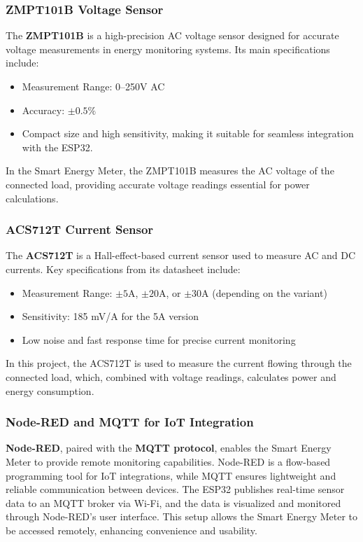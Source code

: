 \documentclass[a4paper,12pt]{report}
\begin{document}
\subsubsection{ZMPT101B Voltage Sensor}  
The \textbf{ZMPT101B} is a high-precision AC voltage sensor designed for accurate voltage measurements in energy monitoring systems. Its main specifications include:  
\begin{itemize}  
    \item Measurement Range: 0--250V AC  
    \item Accuracy: $\pm 0.5\%$  
    \item Compact size and high sensitivity, making it suitable for seamless integration with the ESP32.  
\end{itemize}  
In the Smart Energy Meter, the ZMPT101B measures the AC voltage of the connected load, providing accurate voltage readings essential for power calculations.  

\subsubsection{ACS712T Current Sensor}  
The \textbf{ACS712T} is a Hall-effect-based current sensor used to measure AC and DC currents. Key specifications from its datasheet include:  
\begin{itemize}  
    \item Measurement Range: $\pm 5$A, $\pm 20$A, or $\pm 30$A (depending on the variant)  
    \item Sensitivity: 185 mV/A for the 5A version  
    \item Low noise and fast response time for precise current monitoring  
\end{itemize}  
In this project, the ACS712T is used to measure the current flowing through the connected load, which, combined with voltage readings, calculates power and energy consumption.  

\subsubsection{Node-RED and MQTT for IoT Integration}  
\textbf{Node-RED}, paired with the \textbf{MQTT protocol}, enables the Smart Energy Meter to provide remote monitoring capabilities. Node-RED is a flow-based programming tool for IoT integrations, while MQTT ensures lightweight and reliable communication between devices. The ESP32 publishes real-time sensor data to an MQTT broker via Wi-Fi, and the data is visualized and monitored through Node-RED’s user interface. This setup allows the Smart Energy Meter to be accessed remotely, enhancing convenience and usability.  
\end{document}
